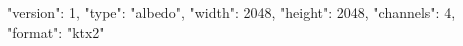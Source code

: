 {
  "version": 1,
  "type": "albedo",
  "width": 2048,
  "height": 2048,
  "channels": 4,
  "format": "ktx2"
}
